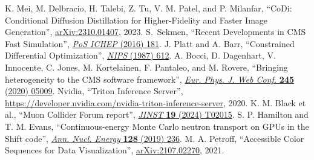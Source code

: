 \begin{thebibliography}{99}
 K. Mei, M. Delbracio, H. Talebi, Z. Tu, V. M. Patel, and P. Milanfar, ``CoDi: Conditional Diffusion Distillation for Higher-Fidelity and Faster Image Generation'', \href{https://arxiv.org/abs/2310.01407}{arXiv:2310.01407}, 2023.
 S.~Sekmen, ``Recent Developments in CMS Fast Simulation'', \href{https://doi.org/10.22323/1.282.0181}{\textit{PoS ICHEP} (2016) 181}.
 J. Platt and A. Barr, ``Constrained Differential Optimization'', \href{https://proceedings.neurips.cc/paper/1987/hash/a87ff679a2f3e71d9181a67b7542122c-Abstract.html}{\textit{NIPS} (1987) 612}.
 A. Bocci, D. Dagenhart, V. Innocente, C. Jones, M. Kortelainen, F. Pantaleo, and M. Rovere, ``Bringing heterogeneity to the CMS software framework'', \href{https://doi.org/10.1051/epjconf/202024505009}{\textit{Eur. Phys. J. Web Conf.} \textbf{245} (2020) 05009}.
 Nvidia, ``Triton Inference Server'', \href{https://developer.nvidia.com/nvidia-triton-inference-server}{https://developer.nvidia.com/nvidia-triton-inference-server}, 2020.
 K. M. Black et al., ``Muon Collider Forum report'', \href{https://doi.org/10.1088/1748-0221/19/02/T02015}{\textit{JINST} \textbf{19} (2024) T02015}.
 S. P. Hamilton and T. M. Evans, ``Continuous-energy Monte Carlo neutron transport on GPUs in the Shift code'', \href{https://doi.org/10.1016/j.anucene.2019.01.012}{\textit{Ann. Nucl. Energy} \textbf{128} (2019) 236}.
 M. A. Petroff, ``Accessible Color Sequences for Data Visualization'', \href{https://arxiv.org/abs/2107.02270}{arXiv:2107.02270}, 2021.
\end{thebibliography}
